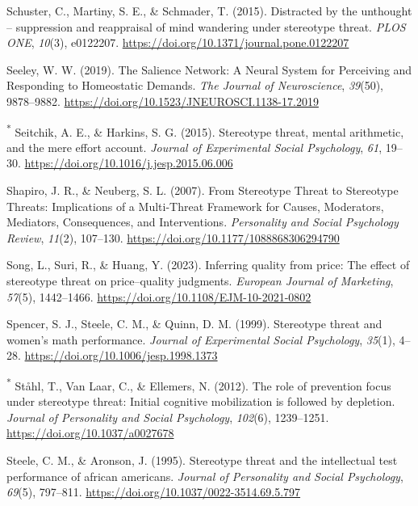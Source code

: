 \documentclass[
  stu, a4paper,floatsintext]{apa7}
\newlength{\cslhangindent}
\newenvironment{CSLReferences}[2] %
 {\begin{list}{}{%
  \setlength{\itemindent}{0pt}
  \setlength{\leftmargin}{0pt}
  \setlength{\parsep}{0pt}
  \ifodd #1
   \setlength{\leftmargin}{\cslhangindent}
   \setlength{\itemindent}{-1\cslhangindent}
  \fi
  \setlength{\itemsep}{#2\baselineskip}}}
 {\end{list}}
\begin{document}
\begin{CSLReferences}{1}{0}
Schuster, C., Martiny, S. E., \& Schmader, T. (2015). Distracted by the unthought -- suppression and reappraisal of mind wandering under stereotype threat. \emph{PLOS ONE}, \emph{10}(3), e0122207. \url{https://doi.org/10.1371/journal.pone.0122207}

Seeley, W. W. (2019). The {Salience Network}: {A Neural System} for {Perceiving} and {Responding} to {Homeostatic Demands}. \emph{The Journal of Neuroscience}, \emph{39}(50), 9878--9882. \url{https://doi.org/10.1523/JNEUROSCI.1138-17.2019}

\textsuperscript{*} Seitchik, A. E., \& Harkins, S. G. (2015). Stereotype threat, mental arithmetic, and the mere effort account. \emph{Journal of Experimental Social Psychology}, \emph{61}, 19--30. \url{https://doi.org/10.1016/j.jesp.2015.06.006}

Shapiro, J. R., \& Neuberg, S. L. (2007). From {Stereotype Threat} to {Stereotype Threats}: {Implications} of a {Multi-Threat Framework} for {Causes}, {Moderators}, {Mediators}, {Consequences}, and {Interventions}. \emph{Personality and Social Psychology Review}, \emph{11}(2), 107--130. \url{https://doi.org/10.1177/1088868306294790}

Song, L., Suri, R., \& Huang, Y. (2023). Inferring quality from price: The effect of stereotype threat on price--quality judgments. \emph{European Journal of Marketing}, \emph{57}(5), 1442--1466. \url{https://doi.org/10.1108/EJM-10-2021-0802}

Spencer, S. J., Steele, C. M., \& Quinn, D. M. (1999). Stereotype threat and women's math performance. \emph{Journal of Experimental Social Psychology}, \emph{35}(1), 4--28. \url{https://doi.org/10.1006/jesp.1998.1373}

\textsuperscript{*} Ståhl, T., Van Laar, C., \& Ellemers, N. (2012). The role of prevention focus under stereotype threat: {Initial} cognitive mobilization is followed by depletion. \emph{Journal of Personality and Social Psychology}, \emph{102}(6), 1239--1251. \url{https://doi.org/10.1037/a0027678}

Steele, C. M., \& Aronson, J. (1995). Stereotype threat and the intellectual test performance of african americans. \emph{Journal of Personality and Social Psychology}, \emph{69}(5), 797--811. \url{https://doi.org/10.1037/0022-3514.69.5.797}


\end{CSLReferences}
\end{document}

